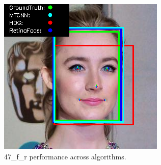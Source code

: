 \documentclass{l4proj}
\begin{document}
\begin{appendices}
\begin{figure}[h!]
\begin{minipage}{0.49\textwidth}
     \includegraphics[width=\textwidth]{images/appendix/47.png}
    \caption{47\_f\_r performance across algorithms.}
    \label{whoopi_result}
  \end{minipage}
\end{figure}
\clearpage

\end{appendices}
\end{document}

